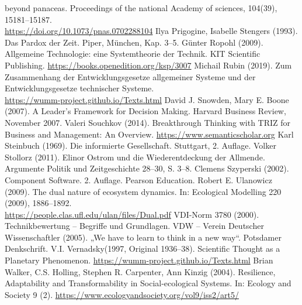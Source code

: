 \documentclass[11pt,a4paper]{article}
\begin{document}
\begin{thebibliography}{xxx}
  beyond panaceas.  Proceedings of the national Academy of sciences, 104(39),
  15181--15187.\\ \url{https://doi.org/10.1073/pnas.0702288104}
 Ilya Prigogine, Isabelle Stengers (1993). Das Pardox
  der Zeit. Piper, München, Kap. 3--5.
 Günter Ropohl (2009). Allgemeine Technologie: eine
  Systemtheorie der Technik.  KIT Scientific Publishing.
  \url{https://books.openedition.org/ksp/3007}
 Michail Rubin (2019).  Zum Zusammenhang der
  Entwicklungsgesetze allgemeiner Systeme und der Entwicklungsgesetze
  technischer Systeme. \\ \url{https://wumm-project.github.io/Texts.html}
 David J. Snowden, Mary E. Boone (2007).  A Leader’s
  Framework for Decision Making.  Harvard Business Review, November 2007.
 Valeri Souchkov (2014). Breakthrough Thinking with TRIZ
  for Business and Management: An Overview.
  \url{https://www.semanticscholar.org}
 Karl Steinbuch (1969). Die informierte Gesellschaft.
  Stuttgart, 2. Auflage.
 Volker Stollorz (2011). Elinor Ostrom und die
  Wiederentdeckung der Allmende. Argumente Politik und Zeitgeschichte 28--30,
  S. 3--8.
 Clemens Szyperski (2002). Component Software.
  2. Auf\-lage.  Pearson Education.
 Robert E. Ulanowicz (2009). The dual nature of
  ecosystem dynamics.  In: Ecological Modelling 220 (2009),
  1886–1892.\\ \url{https://people.clas.ufl.edu/ulan/files/Dual.pdf}
 VDI-Norm 3780 (2000). Technikbewertung -- Begriffe und
  Grundlagen.  
 VDW -- Verein Deutscher Wissenschaftler (2005). „We have to
  learn to think in a new way“. Potsdamer Denkschrift.
 V.I. Vernadsky(1997, Original 1936--38). Scientific
  Thought as a Planetary Phenomenon.
  \url{https://wumm-project.github.io/Texts.html}
 Brian Walker, C.S. Holling, Stephen R. Carpenter, Ann
  Kinzig (2004).  Resilience, Adaptability and Transformability in
  Social-ecological Systems.  In: Ecology and Society 9 (2).
  \url{https://www.ecologyandsociety.org/vol9/iss2/art5/}
\end{thebibliography}
\end{document}
